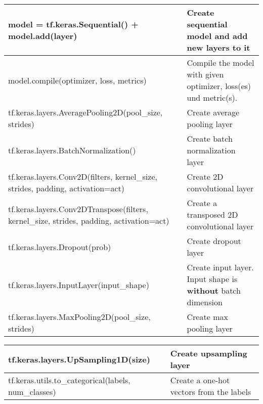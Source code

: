 \begin{tabularx}{\textwidth}{t{9cm} X}
    \hline
    model = tf.keras.Sequential() + model.add(layer)                                         & Create sequential model and add new layers to it                    \\\hline
    model.compile(optimizer, loss, metrics)                                                  & Compile the model with given optimizer, loss(es) und metric(s).     \\\hline

    tf.keras.layers.AveragePooling2D(pool\_size, strides)                                    & Create average pooling layer                                        \\\hline
    tf.keras.layers.BatchNormalization()                                                     & Create batch normalization layer                                    \\\hline
    tf.keras.layers.Conv2D(filters, kernel\_size, strides, padding, activation=act)          & Create 2D convolutional layer                                       \\\hline
    tf.keras.layers.Conv2DTranspose(filters, kernel\_size, strides, padding, activation=act) & Create a transposed 2D convolutional layer                          \\\hline
    tf.keras.layers.Dropout(prob)                                                            & Create dropout layer                                                \\\hline
    tf.keras.layers.InputLayer(input\_shape)                                                 & Create input layer. Input shape is \textbf{without} batch dimension \\\hline
    tf.keras.layers.MaxPooling2D(pool\_size, strides)                                        & Create max pooling layer                                            \\\hline
\end{tabularx}

\begin{tabularx}{\textwidth}{t{9cm} X}
    \hline
    tf.keras.layers.UpSampling1D(size)                   & Create upsampling layer                  \\\hline

    tf.keras.utils.to\_categorical(labels, num\_classes) & Create a one-hot vectors from the labels \\\hline
\end{tabularx}
